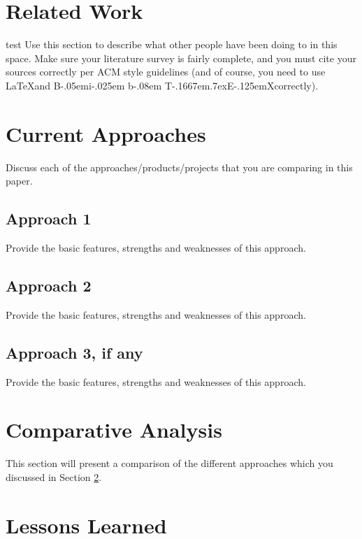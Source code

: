 \documentclass{sig-alternate}
\def\BibTeX{{\rm B\kern-.05em{\sc i\kern-.025em b}\kern-.08em
    T\kern-.1667em\lower.7ex\hbox{E}\kern-.125emX}}
\begin{document}
\section{Related Work}
\label{related work}

test
Use this section to describe what other people have been doing to
in this space. Make sure your literature survey is fairly
complete, and you must cite your sources correctly per ACM style
guidelines (and of course, you need to use \LaTeX and \BibTeX correctly).

\section{Current Approaches}
\label{current approaches}

Discuss each of the approaches/products/projects that you are comparing in this paper. 


\subsection{Approach 1}
\label{approach 1}
Provide the basic features, strengths and weaknesses of this approach. 


\subsection{Approach 2}
\label{approach 2}
Provide the basic features, strengths and weaknesses of this approach. 



\subsection{Approach 3, if any}
\label{approach 3}
Provide the basic features, strengths and weaknesses of this approach. 



\section{Comparative Analysis}
\label{comparative analysis}

This section will present a comparison of the different approaches which you discussed in Section \ref{current approaches}.  


\section{Lessons Learned}
\label{lessons learned}
\end{document}
